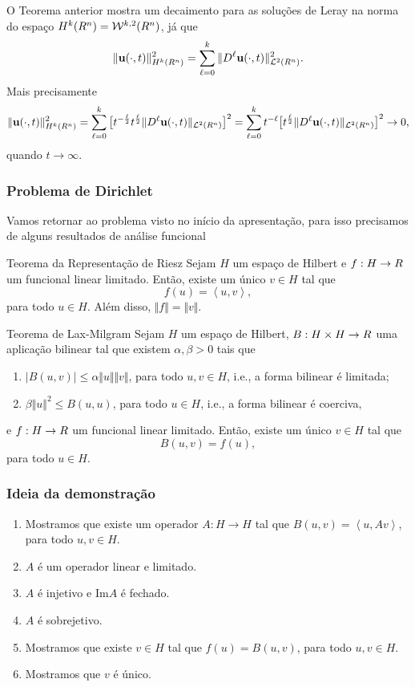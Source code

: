 \documentclass[xcolor=dvipsnames, aspectratio=169, 10pt]{beamer}
\let\mathbb\relax
\newcommand{\bR}{\mathbb{R}}
\newcommand{\bu}{\mathbf{u}}
\newcommand{\cL}{\mathcal{L}}
\newcommand{\cW}{\mathcal{W}}
\begin{document}
\begin{frame}
    O Teorema anterior mostra um decaimento para as soluções de Leray na norma do espaço $H^k(\bR^n) = \cW^{k,2}(\bR^n)$, já que
\[
    \Vert \bu(\cdot,t) \Vert_{H^k(\bR^n)}^2 = \sum_{\ell = 0}^k \Vert D^\ell\bu(\cdot,t) \Vert_{\cL^2(\bR^n)}^2.
\]
Mais precisamente
\[
    \Vert \bu(\cdot,t) \Vert_{H^k(\bR^n)}^2 = \sum_{\ell = 0}^k \big[ t^{-\frac{\ell}{2}} t^{\frac{\ell}{2}} \Vert D^\ell \bu(\cdot,t) \Vert_{\cL^2(\bR^n)} \big]^2 = \sum_{\ell = 0}^k t^{-\ell} \big[ t^{\frac{\ell}{2}} \Vert D^\ell \bu(\cdot,t) \Vert_{\cL^2(\bR^n)} \big]^2 \to 0,
\]
quando $t \to \infty$.
\end{frame}
\begin{frame}
    \frametitle{Problema de Dirichlet}
    Vamos retornar ao problema visto no início da apresentação, para isso precisamos de alguns resultados de análise funcional

    \begin{block}{Teorema da Representação de Riesz}
        Sejam $H$ um espaço de Hilbert e $f : H \to \bR$ um funcional linear limitado.
    Então, existe um único $v \in H$ tal que
    \[
        f(u) = \left\langle u, v\right\rangle,
    \]
    para todo $u \in H$.
    Além disso, $\Vert f \Vert = \Vert v \Vert$.
    \end{block}
\end{frame}
\begin{frame}
    \begin{block}{Teorema de Lax-Milgram}
        Sejam $H$ um espaço de Hilbert, $B : H \times H \to \bR$ uma aplicação bilinear tal que existem $\alpha, \beta > 0$ tais que
    \begin{enumerate}[label=\arabic*.]
        \item $| B(u,v)| \leqslant \alpha \Vert u \Vert \Vert v \Vert$, para todo $u,v \in H$, i.e., a forma bilinear é limitada;
        \item $\beta \Vert u \Vert^2 \leqslant B(u,u)$, para todo $u \in H$, i.e., a forma bilinear é coerciva,
    \end{enumerate}
    e $f : H \to \bR$ um funcional linear limitado. Então, existe um único $v \in H$ tal que
    \[
        B(u,v) = f(u),
    \]
    para todo $u \in H$.
    \end{block}
\end{frame}
\begin{frame}
    \frametitle{Ideia da demonstração}

    \begin{enumerate}[label=\arabic*.]
        \item Mostramos que existe um operador $A : H \to H$ tal que $B(u,v) = \left\langle u, Av \right\rangle$, para todo $u, v \in H$.
        \item $A$ é um operador linear e limitado.
        \item $A$ é injetivo e $\mathrm{Im}A$ é fechado.
        \item $A$ é sobrejetivo.
        \item Mostramos que existe $v \in H$ tal que $f(u) = B(u,v)$, para todo $u,v \in H$.
        \item Mostramos que $v$ é único.
    \end{enumerate}
\end{frame}
\end{document}
